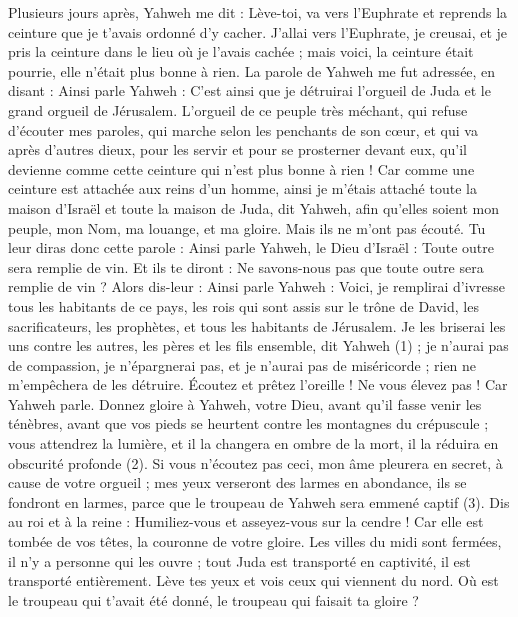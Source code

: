 \begin{multicols}{2}
Plusieurs jours après, Yahweh me dit : Lève-toi, va vers l'Euphrate et reprends la ceinture que je t'avais ordonné d'y cacher.
J’allai vers l'Euphrate, je creusai, et je pris la ceinture dans le lieu où je l'avais cachée ; mais voici, la ceinture était pourrie, elle n'était plus bonne à rien.
La parole de Yahweh me fut adressée, en disant :
Ainsi parle Yahweh : C’est ainsi que je détruirai l'orgueil de Juda et le grand orgueil de Jérusalem.
L'orgueil de ce peuple très méchant, qui refuse d'écouter mes paroles, qui marche selon les penchants de son cœur, et qui va après d'autres dieux, pour les servir et pour se prosterner devant eux, qu’il devienne comme cette ceinture qui n'est plus bonne à rien !
Car comme une ceinture est attachée aux reins d'un homme, ainsi je m'étais attaché toute la maison d'Israël et toute la maison de Juda, dit Yahweh, afin qu'elles soient mon peuple, mon Nom, ma louange, et ma gloire. Mais ils ne m'ont pas écouté.
Tu leur diras donc cette parole : Ainsi parle Yahweh, le Dieu d'Israël : Toute outre sera remplie de vin. Et ils te diront : Ne savons-nous pas que toute outre sera remplie de vin ?
Alors dis-leur : Ainsi parle Yahweh : Voici, je remplirai d'ivresse tous les habitants de ce pays, les rois qui sont assis sur le trône de David, les sacrificateurs, les prophètes, et tous les habitants de Jérusalem.
Je les briserai les uns contre les autres, les pères et les fils ensemble, dit Yahweh\FTNT{} (1) ; je n'aurai pas de compassion, je n’épargnerai pas, et je n’aurai pas de miséricorde ; rien ne m’empêchera de les détruire.
Écoutez et prêtez l'oreille ! Ne vous élevez pas ! Car Yahweh parle.
Donnez gloire à Yahweh, votre Dieu, avant qu'il fasse venir les ténèbres, avant que vos pieds se heurtent contre les montagnes du crépuscule ; vous attendrez la lumière, et il la changera en ombre de la mort, il la réduira en obscurité profonde\FTNT{} (2).
Si vous n'écoutez pas ceci, mon âme pleurera en secret, à cause de votre orgueil ; mes yeux verseront des larmes en abondance, ils se fondront en larmes, parce que le troupeau de Yahweh sera emmené captif\FTNT{} (3).
Dis au roi et à la reine : Humiliez-vous et asseyez-vous sur la cendre ! Car elle est tombée de vos têtes, la couronne de votre gloire.
Les villes du midi sont fermées, il n'y a personne qui les ouvre ; tout Juda est transporté en captivité, il est transporté entièrement.
Lève tes yeux et vois ceux qui viennent du nord. Où est le troupeau qui t'avait été donné, le troupeau qui faisait ta gloire ?

\end{multicols}
